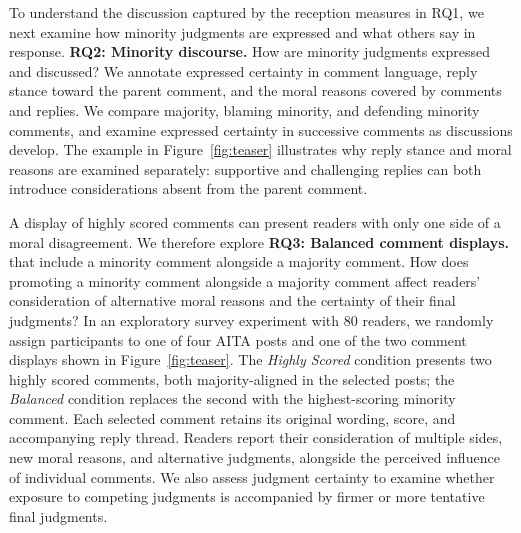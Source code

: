 To understand the discussion captured by the reception measures in
RQ1, we next examine how minority judgments are expressed and what
others say in response. 
\textbf{RQ2: Minority discourse.} How are minority
judgments expressed and discussed? We annotate expressed certainty
in comment language, reply stance toward the parent comment, and
the moral reasons covered by comments and replies. We compare
majority, blaming minority, and defending minority comments, and
examine expressed certainty in successive comments as discussions
develop. The example in Figure~\ref{fig:teaser} illustrates why
reply stance and moral reasons are examined separately: supportive
and challenging replies can both introduce considerations absent
from the parent comment.


A display of highly scored comments can present readers with only
one side of a moral disagreement. We therefore explore 
\textbf{RQ3: Balanced comment displays.}
that include a minority comment alongside a majority
comment.
How does promoting a minority comment alongside a majority comment
affect readers’ consideration of alternative moral reasons and the certainty of their final judgments?
In an exploratory survey experiment with 80 readers, we randomly
assign participants to one of four AITA posts and one of the two
comment displays shown in Figure~\ref{fig:teaser}.
The \emph{Highly Scored} condition presents
two highly scored comments, both majority-aligned in the selected
posts; the \emph{Balanced} condition replaces the second with the
highest-scoring minority comment. Each selected comment retains
its original wording, score, and accompanying reply thread. 
Readers report their consideration of multiple sides, new moral reasons, and alternative judgments, alongside the perceived influence of individual comments. We also assess judgment certainty to examine whether exposure to competing judgments is accompanied by firmer or more tentative final judgments.



